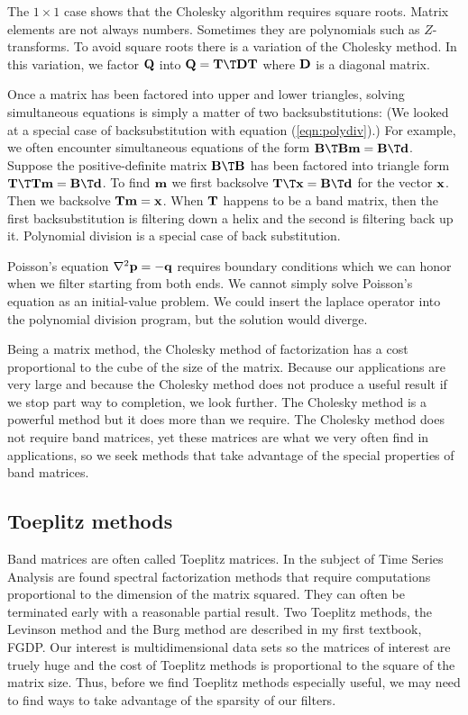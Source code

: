 \par
The $1\times 1$ case shows that the Cholesky algorithm requires square roots.
Matrix elements are not always numbers.
Sometimes they are polynomials such as $Z$-transforms.
To avoid square roots there is a variation
of the Cholesky method.
In this variation, we factor $\bold Q$ into
$\bold Q=\bold T\T\bold D\bold T$
where $\bold D$ is a diagonal matrix.

\par
Once a matrix has been factored into upper and lower triangles,
solving simultaneous equations
is simply a matter of two backsubstitutions:
(We looked at a special case of backsubstitution
with equation (\ref{eqn:polydiv}).)
For example, we often encounter simultaneous equations of the form
$\bold B\T\bold B\bold m=\bold B\T\bold d$.
Suppose the positive-definite matrix
$\bold B\T\bold B$ has been factored into triangle form
$\bold T\T\bold T\bold m=\bold B\T\bold d$.
To find 
$\bold m$
we first backsolve
$\bold T\T\bold x=\bold B\T\bold d$
for the vector
$\bold x$.
Then we backsolve
$\bold T\bold m=\bold x$.
When
$\bold T$
happens to be a band matrix,
then the first backsubstitution is filtering down a helix
and the second is filtering back up it.
Polynomial division is a special case of back substitution.

\par
Poisson's equation
$\nabla^2 \bold p = -\bold q$
requires boundary conditions which we can honor
when we filter starting from both ends.
We cannot simply solve Poisson's equation as
an initial-value problem.
We could insert the laplace operator
into the polynomial division program,
but the solution would diverge.

\par
Being a matrix method, the Cholesky method of factorization
has a cost proportional to the cube of the size of the matrix.
Because our applications are very large
and because the Cholesky method
does not produce a useful result if we stop part way to completion,
we look further.
The Cholesky method is a powerful method but it does more than we require.
The Cholesky method does not require band matrices,
yet these matrices are what we very often find in applications,
so we seek methods that take advantage of the special properties
of band matrices.

\subsection{Toeplitz methods}
Band matrices are often called Toeplitz matrices.
In the subject of Time Series Analysis are found
spectral factorization methods that require computations
proportional to the dimension of the matrix squared.
They can often be terminated early with a reasonable partial result.
Two Toeplitz methods, the Levinson method
and the Burg method are described in my first textbook, FGDP.
Our interest is multidimensional data sets so
the matrices of interest are truely huge and the cost
of Toeplitz methods is proportional to the square of the matrix size.
Thus, before we find Toeplitz methods
especially useful, we may need to find
ways to take advantage of the sparsity of our filters.

